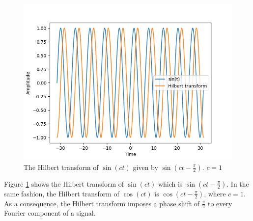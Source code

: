 \documentclass[../Main/thesis.tex]{subfiles}
\begin{document}
\begin{figure}[H]
	\centering
	\includegraphics[width=0.8\linewidth]{../fig/h_sin}
	\caption{The Hilbert transform of $\sin(ct)$ given by $\sin(ct-\frac{\pi}{2})$. $c=1$  }
	\label{fig:hsin}
\end{figure}
\justify
Figure \ref{fig:hsin} shows the Hilbert transform of $\sin(ct)$ which is $\sin\left(ct-\frac{\pi}{2}\right)$. In the same fashion, the Hilbert transform of $\cos(ct)$ is  $\cos\left(ct-\frac{\pi}{2}\right)$, where $c = 1$. As a consequence, the Hilbert transform imposes a phase shift of $\frac{\pi}{2}$ to every Fourier component of a signal. 
\end{document}
